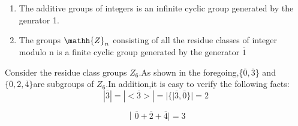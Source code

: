\documentclass[cn,10pt,math=newtx,citestyle=gb7714-2015,bibstyle=gb7714-2015]{elegantbook}
\begin{document}
\begin{example}
\begin{enumerate}
    \item     The additive groups of integers is an  infinite cyclic group generated by the genrator 1.
    \item The groups $\mathh{Z}_n$ consisting of all the residue classes of integer modulo n is a finite cyclic group generated by the generator  $\overline{1}$
\end{enumerate}
\end{example}
\begin{example}
    Consider the residue class groups $Z_6$.As shown in the foregoing,\{$\overline{0},\overline{3}$\} and $\{\overline{0},\overline{2},\overline{4}\}$are subgroups of $Z_6$.In addition,it is easy to verify the following facts:
\begin{equation*}
|\overline{3}|=|<\overline{3}>|=|\{|\overline{3},\overline{0}\}|=2
\end{equation*}


\begin{equation*}      
｜\overline{0}+\overline{2}+\overline{4}|=3
\end{equation*}
\end{example}
\end{document}
